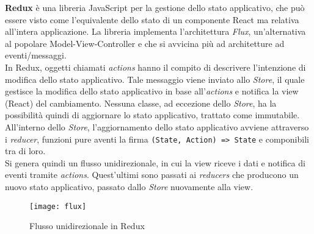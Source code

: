 \textbf{Redux} è una libreria JavaScript per la gestione dello stato applicativo, che può essere visto come l'equivalente dello stato di un componente React ma relativa all'intera applicazione. La libreria implementa l'architettura \textit{Flux}, un'alternativa al popolare Model-View-Controller e che si avvicina più ad architetture ad eventi/messaggi. \\

In Redux, oggetti chiamati \textit{actions} hanno il compito di descrivere l'intenzione di modifica dello stato applicativo. Tale messaggio viene inviato allo \textit{Store}, il quale gestisce la modifica dello stato applicativo in base all'\textit{actions} e notifica la view (React) del cambiamento. Nessuna classe, ad eccezione dello \textit{Store}, ha la possibilità quindi di aggiornare lo stato applicativo, trattato come immutabile. \\

All'interno dello \textit{Store}, l'aggiornamento dello stato applicativo avviene attraverso i \textit{reducer}, funzioni pure aventi la firma \texttt{(State, Action) => State} e componibili tra di loro. \\

Si genera quindi un flusso unidirezionale, in cui la view riceve i dati e notifica di eventi tramite \textit{actions}. Quest'ultimi sono passati ai \textit{reducers} che producono un nuovo stato applicativo, passato dallo \textit{Store} nuovamente alla view.

\begin{figure}[H] 
  \centering 
  \texttt{[image: flux]} 
  \caption{Flusso unidirezionale in Redux}
\end{figure}
